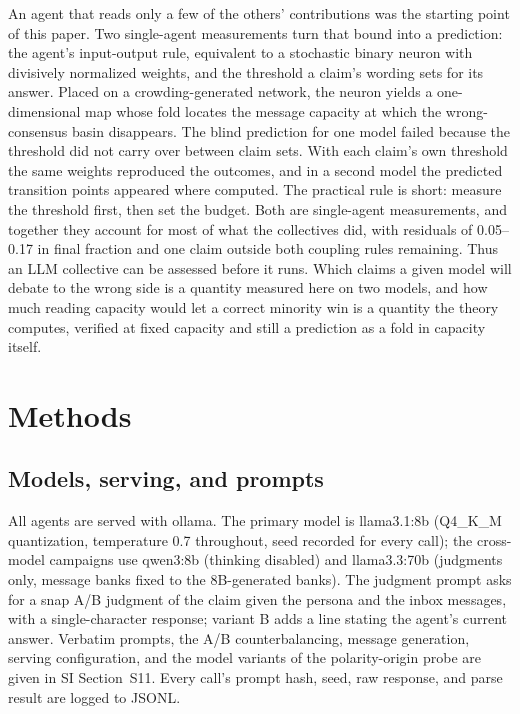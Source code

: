 \documentclass[11pt]{article}
\begin{document}
An agent that reads only a few of the others' contributions was the
starting point of this paper. Two single-agent measurements turn that bound
into a prediction: the agent's input-output rule, equivalent to a
stochastic binary neuron with divisively normalized weights, and the
threshold a claim's wording sets for its answer. Placed on a
crowding-generated network, the neuron yields a one-dimensional map whose
fold locates the message capacity at which the wrong-consensus basin
disappears. The blind prediction for one model failed because the threshold
did not carry over between claim sets. With each claim's own threshold the
same weights reproduced the outcomes, and in a second model the predicted
transition points appeared where computed. The practical rule is short:
measure the threshold first, then set the budget. Both are single-agent
measurements, and together they account for most of what the collectives
did, with residuals of 0.05--0.17 in final fraction and one claim outside
both coupling rules remaining. Thus an LLM collective can be assessed
before it runs. Which claims a given model will debate to the wrong side is
a quantity measured here on two models, and how much reading capacity would
let a correct minority win is a quantity the theory computes, verified at
fixed capacity and still a prediction as a fold in capacity itself.

\section*{Methods}

\subsection*{Models, serving, and prompts}

All agents are served with ollama. The primary model is llama3.1:8b
(Q4\_K\_M quantization, temperature 0.7 throughout, seed recorded for every
call); the cross-model campaigns use qwen3:8b (thinking disabled) and
llama3.3:70b (judgments only, message banks fixed to the 8B-generated banks).
The judgment prompt asks for a snap A/B judgment of the claim given the
persona and the inbox messages, with a single-character response; variant B
adds a line stating the agent's current answer. Verbatim prompts, the A/B
counterbalancing, message generation, serving configuration, and the model
variants of the polarity-origin probe are given in SI Section~S11. Every
call's prompt hash, seed, raw response, and parse result are logged to JSONL.
\end{document}
